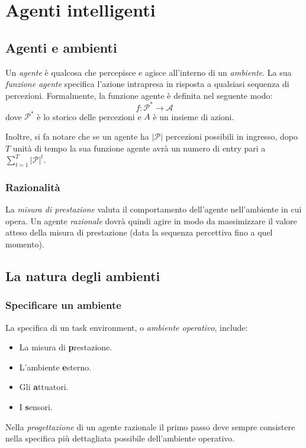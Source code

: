 \documentclass[11pt,oneside]{book}
\begin{document}
\chapter{Agenti intelligenti}

\section{Agenti e ambienti}
Un \textit{agente} è qualcosa che percepisce e agisce all'interno di un \textit{ambiente}. La sua \textit{funzione agente} specifica l'azione intrapresa in risposta a qualsiasi sequenza di percezioni. Formalmente, la funzione agente è definita nel seguente modo:
\[
    f : \mathcal{P}^* \rightarrow \mathcal{A}
\]
dove $\mathcal{P}^*$ è lo storico delle percezioni e $A$ è un insieme di azioni.

Inoltre, si fa notare che se un agente ha $|\mathcal{P}|$ percezioni possibili in ingresso, dopo $T$ unità di tempo la sua funzione agente avrà un numero di entry pari a $\sum_{t=1}^{T} |\mathcal{P}|^t$.

\subsection{Razionalità}
La \textit{misura di prestazione} valuta il comportamento dell'agente nell'ambiente in cui opera. Un agente \textit{razionale} dovrà quindi agire in modo da massimizzare il valore atteso della misura di prestazione (data la sequenza percettiva fino a quel momento).

\section{La natura degli ambienti}
\subsection{Specificare un ambiente}
La specifica di un task environment, o \textit{ambiente operativo}, include:
\begin{itemize}
    \item La misura di \textbf{p}restazione.
    \item L'ambiente \textbf{e}sterno.
    \item Gli \textbf{a}ttuatori.
    \item I \textbf{s}ensori.
\end{itemize}
Nella \textit{progettazione} di un agente razionale il primo passo deve sempre consistere nella specifica più dettagliata possibile dell'ambiente operativo.
\end{document}
